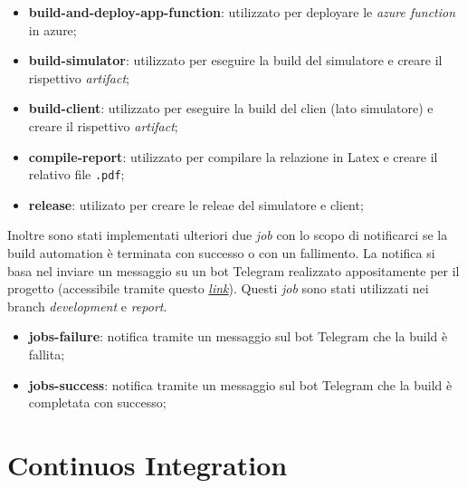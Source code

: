 \begin{itemize}
    \item \textbf{build-and-deploy-app-function}: utilizzato per deployare le \textit{azure function} in azure;
    
    \item \textbf{build-simulator}: utilizzato per eseguire la build del simulatore e creare il rispettivo \textit{artifact};
    
    \item \textbf{build-client}: utilizzato per eseguire la build del clien (lato simulatore) e creare il rispettivo \textit{artifact};
    
    \item \textbf{compile-report}: utilizzato per compilare la relazione in Latex e creare il relativo file \texttt{.pdf};
    
    \item \textbf{release}: utilizato per creare le releae del simulatore e client;
    
\end{itemize}

Inoltre sono stati implementati ulteriori due \textit{job} con lo scopo di notificarci se la build automation è terminata con successo o con un fallimento. La notifica si basa nel inviare un messaggio su un bot Telegram realizzato appositamente per il progetto (accessibile tramite questo \href{https://telegram.me/AzureHealthcareNotificator_bot}{\textit{link}}). Questi \textit{job} sono stati utilizzati nei branch \textit{development} e \textit{report}.  
\begin{itemize}
    \item \textbf{jobs-failure}: notifica tramite un messaggio sul bot Telegram che la build è fallita;  
    
    \item \textbf{jobs-success}: notifica tramite un messaggio sul bot Telegram che la build è completata con successo;  
\end{itemize}

\section{Continuos Integration}